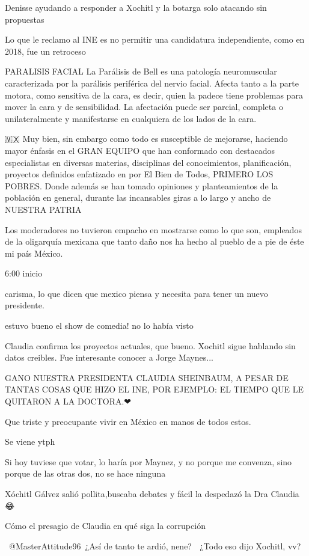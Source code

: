 Denisse ayudando a responder a Xochitl  y la botarga solo atacando sin propuestas

Lo que le reclamo al INE es no permitir una candidatura independiente, como en 2018, fue un retroceso

PARALISIS FACIAL  La Parálisis de Bell es una patología neuromuscular caracterizada por la parálisis periférica del nervio facial. Afecta tanto a la parte motora, como sensitiva de la cara, es decir, quien la padece tiene problemas para mover la cara y de sensibilidad. La afectación puede ser parcial, completa o unilateralmente y manifestarse en cualquiera de los lados de la cara.

🇲🇽 Muy bien, sin embargo como todo es susceptible de mejorarse, haciendo mayor énfasis en el GRAN EQUIPO que han conformado con destacados especialistas en diversas materias, disciplinas del conocimientos, planificación, proyectos definidos enfatizado en por El Bien de Todos, PRIMERO LOS POBRES. Donde además se han tomado opiniones y planteamientos de la población en general, durante las incansables giras a lo largo y ancho de NUESTRA PATRIA

Los moderadores no tuvieron empacho en mostrarse como lo que son, empleados de la oligarquía mexicana que tanto daño nos ha hecho  al pueblo de a pie de éste mi país México.

6:00 inicio

carisma, lo que dicen que mexico piensa y necesita para tener un nuevo presidente.

estuvo bueno el show de comedia! no lo había visto

Claudia confirma los proyectos actuales, que bueno. Xochitl sigue hablando sin datos creibles. Fue interesante conocer a Jorge Maynes...

GANO NUESTRA PRESIDENTA CLAUDIA SHEINBAUM,  A PESAR DE TANTAS COSAS QUE HIZO EL INE, POR EJEMPLO: EL TIEMPO QUE LE QUITARON A LA DOCTORA.❤

Que triste y preocupante vivir en México en manos de todos estos.

Se viene ytph

Si hoy tuviese que votar, lo haría por Maynez, y no porque me convenza, sino porque de las otras dos, no se hace ninguna 🤦🏾‍♂️

Xóchitl Gálvez salió pollita,buscaba debates y fácil la despedazó la Dra Claudia 😂

Cómo el presagio de Claudia en qué siga la corrupción 🤣

​ @MasterAttitude96 ¿Así de tanto te ardió, nene? 🥺
¿Todo eso dijo Xochitl, vv? 🥺

